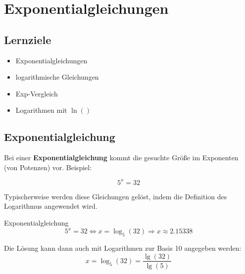 

\section{Exponentialgleichungen}

\subsection*{Lernziele}

\begin{itemize}
\item Exponentialgleichungen
  \item logarithmische Gleichungen 
\item Exp-Vergleich
\item Logarithmen mit $\ln()$
\end{itemize}

\subsection{Exponentialgleichung}
Bei einer \textbf{Exponentialgleichung} kommt die gesuchte Größe im
Exponenten (von Potenzen) vor. Beispiel:

$$5^x = 32$$

Typischerweise werden diese Gleichungen gelöst, indem die Definition
des Logarithmus angewendet wird.

\begin{rezept}{Exponentialgleichung}{}
$$5^x=32 \Longleftrightarrow x=\log_5(32) \Longrightarrow x \approx 2.15338$$

Die Lösung kann dann auch mit Logarithmen zur Basis 10 angegeben
werden:
$$x = \log_5(32) = \frac{\lg(32)}{\lg(5)}$$
\end{rezept}
\newpage

